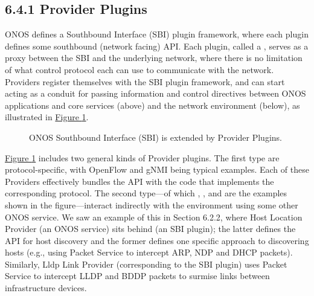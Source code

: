 \documentclass[letterpaper,11pt,english]{sphinxmanual}
\let\sphinxpxdimen\pdfpxdimen\else\newdimen\sphinxpxdimen
\begin{document}
\subsection{6.4.1 Provider Plugins}
\label{\detokenize{onos:provider-plugins}}
ONOS defines a Southbound Interface (SBI) plugin framework, where each
plugin defines some southbound (network facing) API. Each plugin,
called a , serves as a proxy between the SBI and
the underlying network, where there is no limitation of what control
protocol each can use to communicate with the network. Providers
register themselves with the SBI plugin framework, and can start
acting as a conduit for passing information and control directives
between ONOS applications and core services (above) and the network
environment (below), as illustrated in \hyperref[\detokenize{onos:fig-plugins}]{Figure \ref{\detokenize{onos:fig-plugins}}}.

\begin{figure}[htbp]
\centering
\capstart

\noindent\sphinxincludegraphics[width=550\sphinxpxdimen]{{Slide35}.png}
\caption{ONOS Southbound Interface (SBI) is extended by Provider Plugins.}\label{\detokenize{onos:id12}}\label{\detokenize{onos:fig-plugins}}\end{figure}

\hyperref[\detokenize{onos:fig-plugins}]{Figure \ref{\detokenize{onos:fig-plugins}}} includes two general kinds of
Provider plugins. The first type are protocol-specific, with OpenFlow
and gNMI being typical examples. Each of these Providers effectively
bundles the API with the code that implements the corresponding
protocol. The second type—of which , ,
and  are the examples shown in the figure—interact
indirectly with the environment using some other ONOS service. We saw
an example of this in Section 6.2.2, where Host Location Provider (an
ONOS service) sits behind  (an SBI plugin); the latter
defines the API for host discovery and the former defines one specific
approach to discovering hosts (e.g., using Packet Service to intercept
ARP, NDP and DHCP packets). Similarly, Lldp Link Provider
(corresponding to the  SBI plugin) uses Packet Service
to intercept LLDP and BDDP packets to surmise links between
infrastructure devices.
\end{document}
